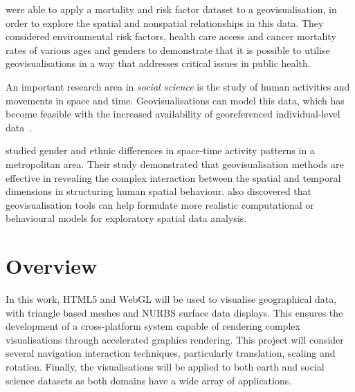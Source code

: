 {	\textcite{maceachren2004geovisualization} were able to apply a mortality and risk factor dataset to a geovisualisation, in order to explore the spatial and nonspatial relationships in this data. They considered environmental risk factors, health care access and cancer mortality rates of various ages and genders to demonstrate that it is possible to utilise geovisualisations in a way that addresses critical issues in public health.

	An important research area in \emph{social science} is the study of human activities and movements in space and time. Geovisualisations can model this data, which has become feasible with the increased availability of georeferenced individual-level data~\parencite{kwan2004geovisualization}.

	\textcite{kwan2004geovisualization} studied gender and ethnic differences in space-time activity patterns in a metropolitan area. Their study demonstrated that geovisualisation methods are effective in revealing the complex interaction between the spatial and temporal dimensions in structuring human spatial behaviour. \citeauthor{kwan2004geovisualization} also discovered that geovisualisation tools can help formulate more realistic computational or behavioural models for exploratory spatial data analysis.

}

\section{Overview} {

	In this work, HTML5 and WebGL will be used to visualise geographical data, with triangle based meshes and NURBS surface data displays. This ensures the development of a cross-platform system capable of rendering complex visualisations through accelerated graphics rendering. This project will consider several navigation interaction techniques, particularly translation, scaling and rotation. Finally, the visualisations will be applied to both earth and social science datasets as both domains have a wide array of applications.

}
